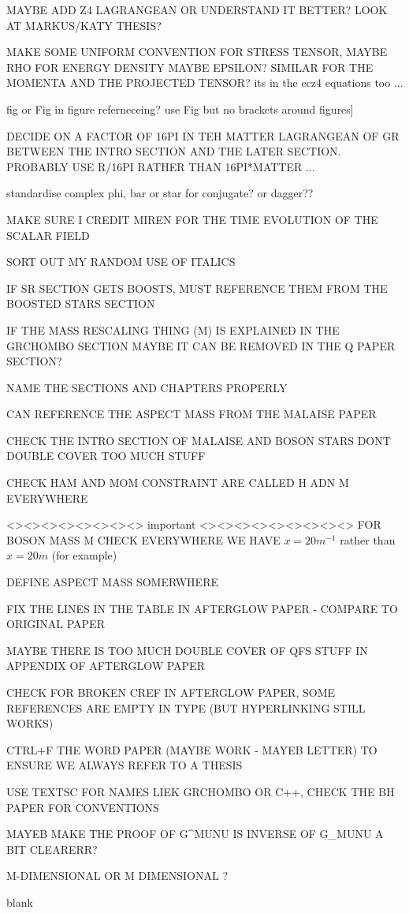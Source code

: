 \documentclass[11pt]{report}  %
\numberwithin{equation}{section}
\begin{document}
MAYBE ADD Z4 LAGRANGEAN OR UNDERSTAND IT BETTER? LOOK AT MARKUS/KATY THESIS?

MAKE SOME UNIFORM CONVENTION FOR STRESS TENSOR, MAYBE RHO FOR ENERGY DENSITY MAYBE EPSILON? SIMILAR FOR THE MOMENTA AND THE PROJECTED TENSOR? its in the ccz4 equations too ...

fig or Fig in figure referneceing? use Fig but no brackets around figures]

DECIDE ON A FACTOR OF 16PI IN TEH MATTER LAGRANGEAN OF GR BETWEEN THE INTRO SECTION AND THE LATER SECTION. PROBABLY USE R/16PI RATHER THAN 16PI*MATTER ... 

standardise complex phi, bar or star for conjugate? or dagger??

MAKE SURE I CREDIT MIREN FOR THE TIME EVOLUTION OF THE SCALAR FIELD

SORT OUT MY RANDOM USE OF ITALICS

IF SR SECTION GETS BOOSTS, MUST REFERENCE THEM FROM THE BOOSTED STARS SECTION

IF THE MASS RESCALING THING (M) IS EXPLAINED IN THE GRCHOMBO SECTION MAYBE IT CAN BE REMOVED IN THE Q PAPER SECTION?

NAME THE SECTIONS AND CHAPTERS PROPERLY

CAN REFERENCE THE ASPECT MASS FROM THE MALAISE PAPER

CHECK THE INTRO SECTION OF MALAISE AND BOSON STARS DONT DOUBLE COVER TOO MUCH STUFF

CHECK HAM AND MOM CONSTRAINT ARE CALLED H ADN M EVERYWHERE

<><><><><><><><> important <><><><><><><><><>
FOR BOSON MASS M CHECK EVERYWHERE WE HAVE   $x = 20 m^{-1}$ rather than $x = 20 m$ (for example) 

DEFINE ASPECT MASS SOMERWHERE 

FIX THE LINES IN THE TABLE IN AFTERGLOW PAPER - COMPARE TO ORIGINAL PAPER

MAYBE THERE IS TOO MUCH DOUBLE COVER OF QFS STUFF IN APPENDIX OF AFTERGLOW PAPER

CHECK FOR BROKEN CREF IN AFTERGLOW PAPER, SOME REFERENCES ARE EMPTY IN TYPE (BUT HYPERLINKING STILL WORKS)

CTRL+F THE WORD PAPER (MAYBE WORK - MAYEB LETTER) TO ENSURE WE ALWAYS REFER TO A THESIS

USE TEXTSC FOR NAMES LIEK GRCHOMBO OR C++, CHECK THE BH PAPER FOR CONVENTIONS

MAYEB MAKE THE PROOF OF G^MUNU IS INVERSE OF G_MUNU A BIT CLEARERR?

M-DIMENSIONAL OR M DIMENSIONAL ?


\begin{thebibliography}{9}

%
%
% 
% 


blank
  \end{thebibliography}



  
\end{document}
